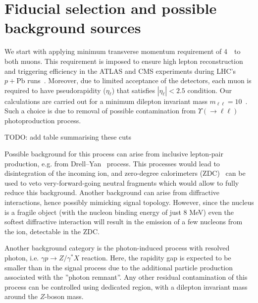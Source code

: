 \section{Fiducial selection and possible background sources}
We start with applying minimum transverse momentum requirement of 4~\GeV\ to both muons.
This requirement is imposed to ensure high lepton reconstruction and triggering efficiency in the ATLAS and CMS experiments during LHC's $p+\textrm{Pb}$ runs~\cite{}.
Moreover, due to limited acceptance of the detectors, each muon is required to have pseudorapidity ($\eta_{\ell}$) that satisfies $|\eta_{\ell}|<2.5$ condition.
Our calculations are carried out for a minimum dilepton invariant mass $m_{\ell\ell} = 10$~\GeV. 
Such a choice is due to removal of possible contamination from $\Upsilon(\rightarrow \ell\ell)$ photoproduction process.

TODO: add table summarising these cuts


Possible background for this process can arise from inclusive lepton-pair production, e.g. from Drell--Yan~\cite{Drell:1970wh} process.
This processes would lead to disintegration of the incoming ion, and zero-degree calorimeters (ZDC)~\cite{Dellacasa:1999ke,ATLAS:2007aa} can be used to veto very-forward-going neutral fragments which would allow to fully reduce this background.
Another background can arise from diffractive interactions, hence possibly mimicking signal topology.
However, since the nucleus is a fragile object (with the nucleon binding energy of just 8 MeV) even the softest diffractive interaction will result in the emission of a few nucleons from the ion, detectable in the ZDC.

Another background category is the photon-induced process with resolved photon, i.e. 
$\gamma p\rightarrow Z/\gamma^*X$ reaction.
Here, the rapidity gap is expected to be smaller than in the signal process due to the additional particle production associated with the ''photon remnant''.
Any other residual contamination of this process can be controlled using dedicated region, with a dilepton invariant mass around the $Z$-boson mass.



